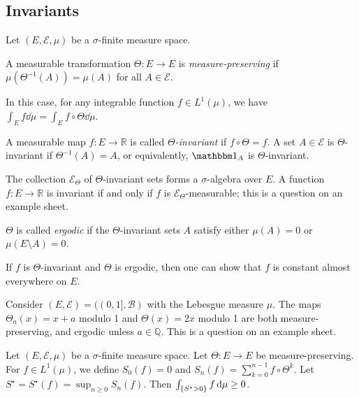 \subsection{Invariants}
Let \( (E, \mathcal E, \mu) \) be a \( \sigma \)-finite measure space.
\begin{definition}
	A measurable transformation \( \Theta \colon E \to E \) is \emph{measure-preserving} if \( \mu(\Theta^{-1}(A)) = \mu(A) \) for all \( A \in \mathcal E \).
\end{definition}
In this case, for any integrable function \( f \in L^1(\mu) \), we have \( \int_E f \dd{\mu} = \int_E f \circ \Theta \dd{\mu} \).
\begin{definition}
	A measurable map \( f \colon E \to \mathbb R \) is called \emph{\( \Theta \)-invariant} if \( f \circ \Theta = f \).
	A set \( A \in \mathcal E \) is \( \Theta \)-invariant if \( \Theta^{-1}(A) = A \), or equivalently, \( \mathbbm 1_A \) is \( \Theta \)-invariant.
\end{definition}
The collection \( \mathcal E_\Theta \) of \( \Theta \)-invariant sets forms a \( \sigma \)-algebra over \( E \).
A function \( f \colon E \to \mathbb R \) is invariant if and only if \( f \) is \( \mathcal E_\Theta \)-measurable; this is a question on an example sheet.
\begin{definition}
	\( \Theta \) is called \emph{ergodic} if the \( \Theta \)-invariant sets \( A \) satisfy either \( \mu(A) = 0 \) or \( \mu(E \setminus A) = 0 \).
\end{definition}
If \( f \) is \( \Theta \)-invariant and \( \Theta \) is ergodic, then one can show that \( f \) is constant almost everywhere on \( E \).
\begin{example}
	Consider \( (E, \mathcal E) = ((0,1], \mathcal B) \) with the Lebesgue measure \( \mu \).
	The maps \( \Theta_a(x) = x + a \) modulo 1 and \( \Theta(x) = 2x \) modulo 1 are both measure-preserving, and ergodic unless \( a \in \mathbb Q \).
	This is a question on an example sheet.
\end{example}
\begin{lemma}
    Let \( (E, \mathcal E, \mu) \) be a \( \sigma \)-finite measure space.
	Let \( \Theta \colon E \to E \) be measure-preserving.
	For \( f \in L^1(\mu) \), we define \( S_0(f) = 0 \) and \( S_n(f) = \sum_{k=0}^{n-1} f \circ \Theta^k \).
    Let \( S^\star = S^\star(f) = \sup_{n \geq 0} S_n(f) \).
    Then \( \int_{\qty{S^\star > 0}} f \dd{\mu} \geq 0 \).
\end{lemma}
